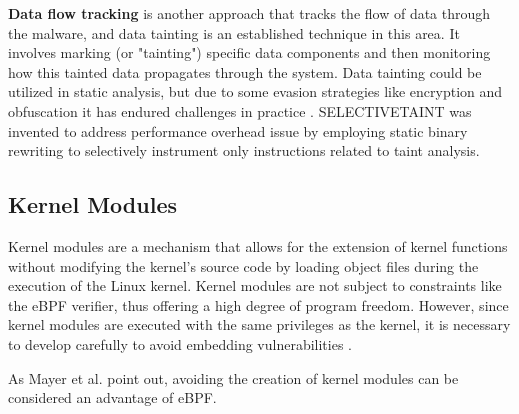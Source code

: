 \textbf{Data flow tracking} is another approach that tracks the flow of data through the malware, and data tainting is an established
technique in this area. It involves marking (or "tainting") specific data components and then monitoring
how this tainted data propagates through the system.
Data tainting could be utilized in static analysis, but due to some evasion strategies like encryption and obfuscation
it has endured challenges in practice \cite{alashjee2019dynamic}.
SELECTIVETAINT \cite{chen2021selectivetaint} was invented to address performance overhead issue by employing static binary
rewriting to selectively instrument only instructions related to taint analysis.




\subsection{Kernel Modules}
Kernel modules are a mechanism that allows for the extension of kernel functions without modifying the kernel's
source code by loading object files during the execution of the Linux kernel.
Kernel modules are not subject to constraints like the eBPF verifier, thus offering a high degree of program freedom.
However, since kernel modules are executed with the same privileges as the kernel,
it is necessary to develop carefully to avoid embedding vulnerabilities \cite{chen2011linux}.

As Mayer et al. \cite{mayer2021performance} point out, avoiding the creation of kernel modules can be
considered an advantage of eBPF.
